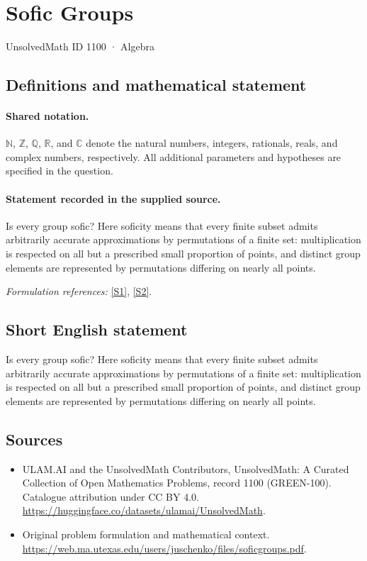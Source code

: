 \documentclass[11pt]{article}
\newcommand{\sref}[2]{\hyperlink{source:#1:#2}{[S#2]}}
\begin{document}
\setcounter{section}{1099}
\section{Sofic Groups}\label{1100}
{\small UnsolvedMath ID 1100 · Algebra}
\subsection{Definitions and mathematical statement}

\paragraph{Shared notation.}$\mathbb N$, $\mathbb Z$, $\mathbb Q$, $\mathbb R$, and $\mathbb C$ denote the natural numbers, integers, rationals, reals, and complex numbers, respectively. All additional parameters and hypotheses are specified in the question.


\paragraph{Statement recorded in the supplied source.}
Is every group sofic? Here soficity means that every finite subset admits arbitrarily accurate approximations by permutations of a finite set: multiplication is respected on all but a prescribed small proportion of points, and distinct group elements are represented by permutations differing on nearly all points.
\par\smallskip\textit{Formulation references:} \sref{1100}{1}, \sref{1100}{2}.
\subsection{Short English statement}
Is every group sofic? Here soficity means that every finite subset admits arbitrarily accurate approximations by permutations of a finite set: multiplication is respected on all but a prescribed small proportion of points, and distinct group elements are represented by permutations differing on nearly all points.
\subsection{Sources}
\begin{itemize}
\item[\hypertarget{source:1100:1}{S1}] ULAM.AI and the UnsolvedMath Contributors, UnsolvedMath: A Curated Collection of Open Mathematics Problems, record 1100 (GREEN-100). Catalogue attribution under CC BY 4.0.
\url{https://huggingface.co/datasets/ulamai/UnsolvedMath}.
\item[\hypertarget{source:1100:2}{S2}] Original problem formulation and mathematical context.
\url{https://web.ma.utexas.edu/users/juschenko/files/soficgroups.pdf}.
\end{itemize}
\label{end:1100}
\end{document}
